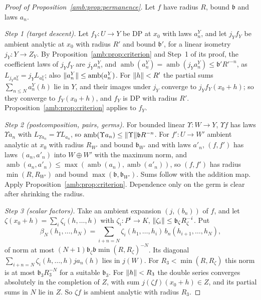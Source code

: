 \begin{proof}[Proof of Proposition~\ref{amb:prop:permanence}]
Let $f$ have radius $R$, bound $\mathfrak b$ and laws $a_n$.

\emph{Step 1 (target descent).} Let $f_Y\colon U\to Y$ be DP at $x_0$ with laws $a^Y_n$, and let $j_Yf_Y$ be ambient analytic at $x_0$ with radius $R'$ and bound $\mathfrak b'$, for a linear isometry $j_Y\colon Y\to Z_Y$. By Proposition~\ref{amb:prop:criterion} and Step~1 of its proof, the coefficient laws of $j_Yf_Y$ are $j_Ya^Y_n$, and $\operatorname{amb}(a^Y_n)=\operatorname{amb}(j_Ya^Y_n)\le \mathfrak b'R'^{-n}$, as $L_{j_Ya^Y_n}=j_YL_{a^Y_n}$; also $\lVert a^Y_n\rVert\le\operatorname{amb}(a^Y_n)$. For $\lVert h\rVert<R'$ the partial sums $\sum_{n\le N}a^Y_n(h)$ lie in $Y$, and their images under $j_Y$ converge to $j_Yf_Y(x_0+h)$; so they converge to $f_Y(x_0+h)$, and $f_Y$ is DP with radius $R'$. Proposition~\ref{amb:prop:criterion} applies to $f_Y$.

\emph{Step 2 (postcomposition, pairs, germs).} For bounded linear $\Upsilon\colon W\to Y$, $\Upsilon f$ has laws $\Upsilon a_n$ with $L_{\Upsilon a_n}=\Upsilon L_{a_n}$, so $\operatorname{amb}(\Upsilon a_n)\le\lVert \Upsilon\rVert \mathfrak bR^{-n}$. For $f'\colon U\to W'$ ambient analytic at $x_0$ with radius $R_{W'}$ and bound $\mathfrak b_{W'}$ and with laws $a'_n$, $(f,f')$ has laws $(a_n,a'_n)$ into $W\oplus W'$ with the maximum norm, and $\operatorname{amb}(a_n,a'_n)\le\max(\operatorname{amb}(a_n),\operatorname{amb}(a'_n))$, so $(f,f')$ has radius $\min(R,R_{W'})$ and bound $\max(\mathfrak b,\mathfrak b_{W'})$. Sums follow with the addition map. Apply Proposition~\ref{amb:prop:criterion}. Dependence only on the germ is clear after shrinking the radius.

\emph{Step 3 (scalar factors).} Take an ambient expansion $(j,(b_n))$ of $f$, and let $\zeta(x_0+h)=\sum_i\zeta_i(h,\dots,h)$ with $\zeta_i\colon P^i\to K$, $\lVert \zeta_i\rVert\le \mathfrak b_\zeta R_\zeta^{-i}$. Put
\[
 \beta_N(h_1,\dots,h_N)=\sum_{i+n=N}\zeta_i(h_1,\dots,h_i)\,b_n(h_{i+1},\dots,h_N),
\]
of norm at most $(N+1)\mathfrak b_\zeta \mathfrak b\min(R,R_\zeta)^{-N}$. Its diagonal $\sum_{i+n=N}\zeta_i(h,\dots,h)ja_n(h)$ lies in $j(W)$. For $R_3<\min(R,R_\zeta)$ this norm is at most $\mathfrak b_3R_3^{-N}$ for a suitable $\mathfrak b_3$. For $\lVert h\rVert<R_3$ the double series converges absolutely in the completion of $Z$, with sum $j(\zeta f)(x_0+h)\in Z$, and its partial sums in $N$ lie in $Z$. So $\zeta f$ is ambient analytic with radius $R_3$.


\end{proof}
